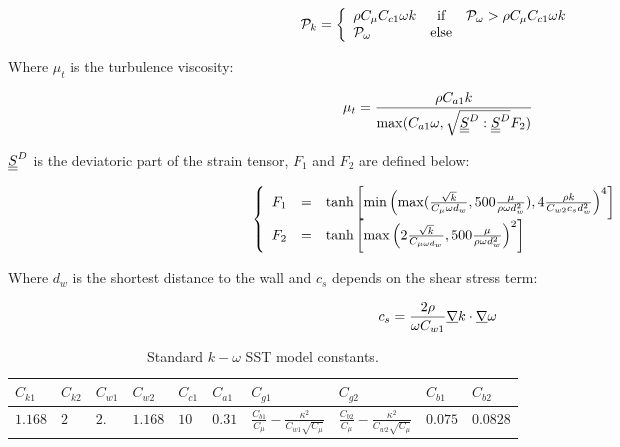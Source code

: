 \begin{equation}
\mathcal{P}_k = \left\{
\begin{array}{l c r}
\rho C_{\mu} C_{c1} \omega k & \text{if} & \mathcal{P}_{\omega} > \rho C_{\mu}  C_{c1}\omega k\\
\mathcal{P}_{\omega} & \text{else} & \\
\end{array}
\right.
\end{equation}

Where $\mu_t$ is the turbulence viscosity:

\begin{equation}
\mu_t = \frac{\rho C_{a1} k}{\max(C_{a1} \omega, \sqrt{\underline{\underline{S}}^D:\underline{\underline{S}}^D}F_2)} 
\end{equation}

$\underline{\underline{S}}^D$ is the deviatoric part of the strain tensor, $F_1$ and $F_2$ are defined below:

\begin{equation}
\left\{
\begin{array}{r c l}
F_1 & = & \tanh\left[\min\left(\max(\frac{\sqrt{k}}{C_{\mu}\omega d_w}, 500\frac{\mu}{\rho \omega d_w^2}), 4\frac{\rho k}{C_{w2} c_{s} d_w^2}\right)^4\right]\\
F_2 & = & \tanh\left[\max\left(2\frac{\sqrt{k}}{C_{\mu \omega d_w}}, 500\frac{\mu}{\rho \omega d_w^2}\right)^2\right]\\
\end{array}
\right.
\end{equation}

Where $d_w$ is the shortest distance to the wall and $c_s$ depends on the shear stress term:

\begin{equation}
c_s = \frac{2\rho}{\omega C_{w1}} \underline{\nabla}{k} \cdot \underline{\nabla}{\omega}
\end{equation}

\begin{table}[!htp]
\centering
\begin{tabular}{p{1cm}|p{1cm}|p{1cm}|p{1cm}|p{1cm}|p{1cm}|p{2.5cm}|p{2.5cm}|p{1cm}|p{1cm}}
$C_{k1}$ & $C_{k2}$ & $C_{w1}$ & $C_{w2}$ & $C_{c1}$ & $C_{a1}$ & $C_{g1}$ & $C_{g2}$ & $C_{b1}$ & $C_{b2}$ \\ \hline
$1.168$ & $2$ & $2.$ & $1.168$ & $10$ & $0.31$ & $\frac{C_{b1}}{C_{\mu}}-\frac{\kappa^2}{C_{w1}\sqrt{C_{\mu}}}$ & $\frac{C_{b2}}{C_{\mu}}-\frac{\kappa^2}{C_{w2}\sqrt{C_{\mu}}}$ & $0.075$ & $0.0828$ 
\end{tabular}%
\caption{Standard $k-\omega$ SST model constants.
\label{tab:k_omega_constants}}
\end{table}

